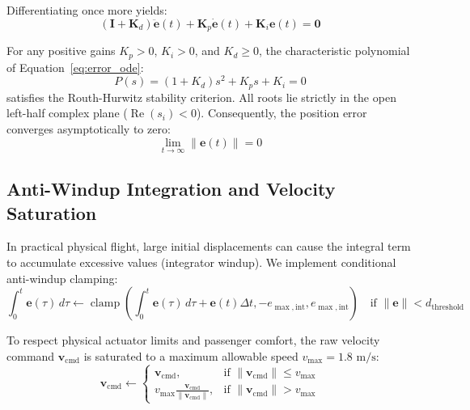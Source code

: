 \documentclass[11pt,a4paper]{article}
\begin{document}
Differentiating once more yields:
\begin{equation}
(\mathbf{I} + \mathbf{K}_d) \mathbf{\ddot{e}}(t) + \mathbf{K}_p \mathbf{\dot{e}}(t) + \mathbf{K}_i \mathbf{e}(t) = \mathbf{0}
\label{eq:error_ode}
\end{equation}

\begin{tcolorbox}[title=Theorem 1: Asymptotic Stability of the Single-Integrator Error Dynamics]
For any positive gains $K_p > 0$, $K_i > 0$, and $K_d \geq 0$, the characteristic polynomial of Equation~\eqref{eq:error_ode}:
\begin{equation}
P(s) = (1 + K_d) s^2 + K_p s + K_i = 0
\end{equation}
satisfies the Routh-Hurwitz stability criterion. All roots lie strictly in the open left-half complex plane ($\operatorname{Re}(s_i) < 0$). Consequently, the position error converges asymptotically to zero:
\begin{equation}
\lim_{t \to \infty} \|\mathbf{e}(t)\| = 0
\end{equation}
\end{tcolorbox}

\subsection{Anti-Windup Integration and Velocity Saturation}
In practical physical flight, large initial displacements can cause the integral term to accumulate excessive values (integrator windup). We implement conditional anti-windup clamping:
\begin{equation}
\int_0^t \mathbf{e}(\tau)\,d\tau \leftarrow \operatorname{clamp}\left( \int_0^t \mathbf{e}(\tau)\,d\tau + \mathbf{e}(t) \Delta t, -e_{\max,\mathrm{int}}, e_{\max,\mathrm{int}} \right) \quad \text{if } \|\mathbf{e}\| < d_{\mathrm{threshold}}
\end{equation}

To respect physical actuator limits and passenger comfort, the raw velocity command $\mathbf{v}_{\mathrm{cmd}}$ is saturated to a maximum allowable speed $v_{\max} = 1.8\text{ m/s}$:
\begin{equation}
\mathbf{v}_{\mathrm{cmd}} \leftarrow 
\begin{cases}
\mathbf{v}_{\mathrm{cmd}}, & \text{if } \|\mathbf{v}_{\mathrm{cmd}}\| \leq v_{\max} \\
v_{\max} \frac{\mathbf{v}_{\mathrm{cmd}}}{\|\mathbf{v}_{\mathrm{cmd}}\|}, & \text{if } \|\mathbf{v}_{\mathrm{cmd}}\| > v_{\max}
\end{cases}
\end{equation}
\end{document}
